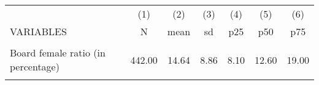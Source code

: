 \begin{tabular}{lcccccc} \hline
 & (1) & (2) & (3) & (4) & (5) & (6) \\
VARIABLES & N & mean & sd & p25 & p50 & p75 \\ \hline
 &  &  &  &  &  &  \\
Board female ratio (in percentage) & 442.00 & 14.64 & 8.86 & 8.10 & 12.60 & 19.00 \\
 &  &  &  &  &  &  \\ \hline
\end{tabular}
